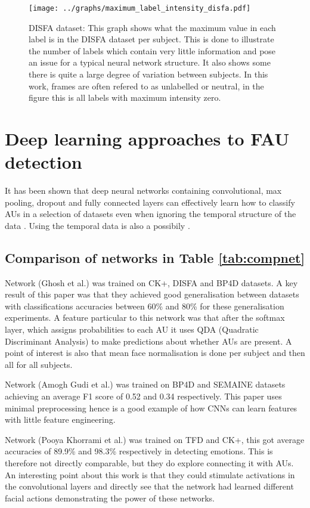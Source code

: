 \begin{figure}[h!]
  \texttt{[image: ../graphs/maximum\_label\_intensity\_disfa.pdf]}
  \caption{DISFA dataset: This graph shows what the maximum value in each label is in the DISFA dataset per subject. This
  is done to illustrate the number of labels which contain very little information
  and pose an issue for a typical neural network structure. It also shows some there
  is quite a large degree of variation between subjects. In this work, frames are often refered to as unlabelled or neutral,
  in the figure this is all labels with maximum intensity zero.}\label{disfastats}
\end{figure}
\newpage

\section{Deep learning approaches to FAU detection}
It has been shown that deep neural networks containing convolutional, max pooling,
dropout and fully connected layers can effectively learn how to classify AUs in
a selection of datasets even when ignoring the temporal structure of the data \cite{Gudi2015,Ghosh2015,dodeeplearn}.
Using the temporal data is also a possibily \cite{emonet,Jaiswal2016}.
%
%
%
\subsection*{Comparison of networks in Table \ref{tab:compnet}}
Network \cite{Ghosh2015} (Ghosh et al.) was trained on CK+, DISFA and BP4D datasets.
A key result of this paper was that they achieved good generalisation between datasets
with classifications accuracies between 60\% and 80\% for these generalisation experiments.
A feature particular to this network was that after the softmax layer, which assigns probabilities
to each AU it uses QDA (Quadratic Discriminant Analysis\cite{precogbook})  to
make predictions about whether AUs are present. A point of interest is also that
mean face normalisation is done per subject and then all for all subjects.

Network \cite{Gudi2015} (Amogh Gudi et al.) was trained on BP4D and SEMAINE
datasets achieving an average F1 score of 0.52 and 0.34 respectively. This paper
uses minimal preprocessing hence is a good example of how CNNs can learn features
with little feature engineering.

Network \cite{dodeeplearn} (Pooya Khorrami et al.) was trained on TFD and CK+,
this got average accuracies of 89.9\% and 98.3\% respectively in detecting emotions. This
is therefore not directly comparable, but they do explore connecting it with AUs.
An interesting point about this work is that they could stimulate activations in the convolutional
layers and directly see that the network had learned different facial actions demonstrating the
power of these networks.

